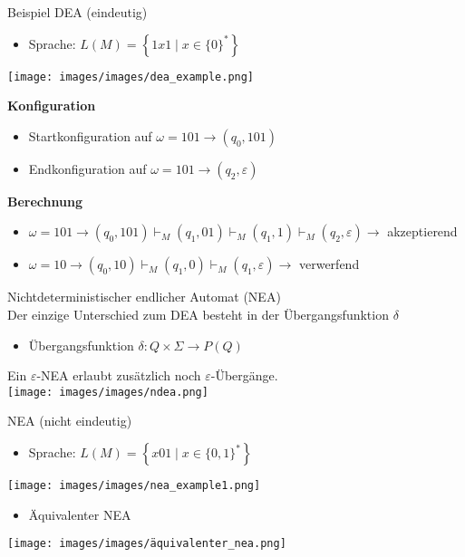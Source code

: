\begin{example2}{Beispiel DEA (eindeutig)}
    \begin{itemize}
    \item Sprache: $L(M)=\left\{1 x 1 \mid x \in\{0\}^{*}\right\}$
    \end{itemize}
    \texttt{[image: images/images/dea\_example.png]}

    \textbf{Konfiguration}
    \begin{itemize}
    \item Startkonfiguration auf $\omega=101 \rightarrow\left(q_{0}, 101\right)$
    \item Endkonfiguration auf $\omega=101 \rightarrow\left(q_{2}, \varepsilon\right)$
    \end{itemize}

    \textbf{Berechnung}
    \begin{itemize}
    \item $\omega=101 \rightarrow\left(q_{0}, 101\right) \vdash_{M}\left(q_{1}, 01\right) \vdash_{M}\left(q_{1}, 1\right) \vdash_{M}\left(q_{2}, \varepsilon\right) \rightarrow$ akzeptierend
    \item $\omega=10 \rightarrow\left(q_{0}, 10\right) \vdash_{M}\left(q_{1}, 0\right) \vdash_{M}\left(q_{1}, \varepsilon\right) \rightarrow$ verwerfend
    \end{itemize}
\end{example2}

\begin{definition}{Nichtdeterministischer endlicher Automat (NEA)}\\
    Der einzige Unterschied zum DEA besteht in der Übergangsfunktion $\delta$
    \begin{itemize}
    \item Übergangsfunktion $\delta: Q \times \Sigma \rightarrow P(Q)$
    \end{itemize}
    Ein $\varepsilon$-NEA erlaubt zusätzlich noch $\varepsilon$-Übergänge.\\
    \texttt{[image: images/images/ndea.png]}
\end{definition}

\begin{example2}{NEA (nicht eindeutig)}
    \begin{itemize}
        \item Sprache: $L(M)=\left\{x 01 \mid x \in\{0,1\}^{*}\right\}$
    \end{itemize}
    \texttt{[image: images/images/nea\_example1.png]}
    \begin{itemize}
        \item Äquivalenter NEA
    \end{itemize}
    \texttt{[image: images/images/äquivalenter\_nea.png]}
\end{example2}

